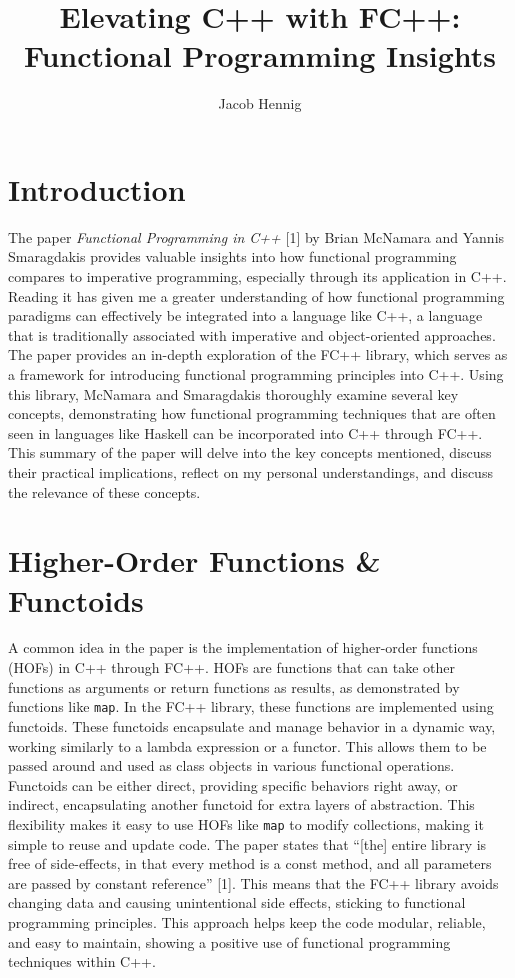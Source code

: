 \documentclass[12pt]{article}
\title{Elevating C++ with FC++: Functional Programming Insights}
\author{Jacob Hennig}
\date{}
\begin{document}
\maketitle
{}

\section{Introduction}
The paper \textit{Functional Programming in C++} [1] by Brian McNamara and Yannis Smaragdakis provides valuable insights into how functional programming compares to imperative programming, especially through its application in C++. Reading it has given me a greater understanding of how functional programming paradigms can effectively be integrated into a language like C++, a language that is traditionally associated with imperative and object-oriented approaches. The paper provides an in-depth exploration of the FC++ library, which serves as a framework for introducing functional programming principles into C++. Using this library, McNamara and Smaragdakis thoroughly examine several key concepts, demonstrating how functional programming techniques that are often seen in languages like Haskell can be incorporated into C++ through FC++. This summary of the paper will delve into the key concepts mentioned, discuss their practical implications, reflect on my personal understandings, and discuss the relevance of these concepts.

\section{Higher-Order Functions \& Functoids}
A common idea in the paper is the implementation of higher-order functions (HOFs) in C++ through FC++. HOFs are functions that can take other functions as arguments or return functions as results, as demonstrated by functions like \texttt{map}. In the FC++ library, these functions are implemented using functoids. These functoids encapsulate and manage behavior in a dynamic way, working similarly to a lambda expression or a functor. This allows them to be passed around and used as class objects in various functional operations. Functoids can be either direct, providing specific behaviors right away, or indirect, encapsulating another functoid for extra layers of abstraction. This flexibility makes it easy to use HOFs like \texttt{map} to modify collections, making it simple to reuse and update code. The paper states that ``[the] entire library is free of side-effects, in that every method is a const method, and all parameters are passed by constant reference'' [1]. This means that the FC++ library avoids changing data and causing unintentional side effects, sticking to functional programming principles. This approach helps keep the code modular, reliable, and easy to maintain, showing a positive use of functional programming techniques within C++.
\end{document}

